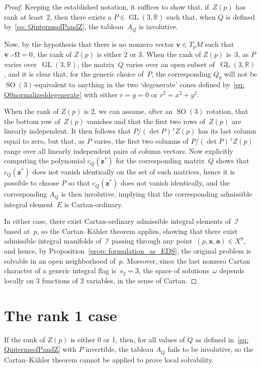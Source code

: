 \documentclass[pdftex]{sigma}
\numberwithin{equation}{section}
\newcommand{\cI}{{\mathcal I}}
\newcommand{\bbR}{{\mathbb R}}
\newcommand{\GL}{\operatorname{GL}}
\newcommand{\SO}{\operatorname{SO}}
\newcommand{\mba}{\mathbf{a}}
\newcommand{\mbv}{\mathbf{v}}
\newcommand{\mbx}{\mathbf{x}}
\newcommand{\mbz}{\mathbf{z}}
\newcommand{\lhk}{\mathbin{\hbox{\vrule height1.4pt width4pt depth-1pt
 \vrule height4pt width0.4pt depth-1pt}}}
\begin{document}
\begin{proof}Keeping the established notation, it suffices to show that, if~$Z(p)$ has rank at least~$2$, then there exists a $P\in\GL(3,\bbR)$ such that, when $Q$ is defined by~\eqref{eq: QintermsofPandZ}, the tableau~$A_Q$ is involutive.

Now, by the hypothesis that there is no nonzero vector $\mbv\in T_pM$
such that $\mbv\lhk\Omega=0$, the rank of $Z(p)$ is either $2$ or $3$.
When the rank of $Z(p)$ is~$3$,
as $P$ varies over~$\GL(3,\bbR)$,
the matrix~$Q$ varies over an open subset of~$\GL(3,\bbR)$,
and it is clear that, for the generic choice of~$P$,
the corresponding $Q_0$ will not be $\SO(3)$-equivalent to anything
in the two `degenerate' cones defined by~\eqref{eq: Q0normalizeddegenerate}
with either $r=y=0$ or $r^2=x^2+y^2$.

When the rank of $Z(p)$ is $2$, we can assume, after an $\SO(3)$ rotation,
that the bottom row of~$Z(p)$ vanishes and that the first two rows of~$Z(p)$
are linearly independent. It then follows that $P/(\det P)\, {}^t\!Z(p)$
has its last column equal to zero, but that, as $P$ varies, the first
two columns of $P/(\det P)\, {}^t\!Z(p)$ range over all linearly independent
pairs of column vectors. Now explicitly computing the polynomial $c_Q(\mbz^*)$
for the corresponding matrix~$Q$ shows that $c_Q(\mbz^*)$ does not vanish
identically on the set of such matrices, hence it is possible to choose $P$
so that $c_Q(\mbz^*)$ does not vanish identically, and the corresponding $A_Q$
is then involutive, implying that the corresponding admissible integral
element~$E$ is Cartan-ordinary.

In either case, there exist Cartan-ordinary admissible integral elements
of~$\cI$ based at~$p$, so the Cartan--K\"ahler theorem applies, showing
that there exist admissible integral manifolds of~$\cI$ passing through
any point~$(p,\mbx,\mba)\in X^9$, and hence,
by Proposition~\ref{prop: formulation_as_EDS},
the original problem is solvable in an open neighborhood of~$p$.
Moreover, since the last nonzero Cartan character
of a generic integral flag is~$s_2 = 3$,
the space of solutions~$\omega$
depends locally on $3$ functions of $2$ variables,
in the sense of Cartan.
\end{proof}

\section{The rank 1 case}\label{sec: Zrank1}
If the rank of $Z(p)$ is either 0 or 1,
then, for all values of $Q$ as defined in~\eqref{eq: QintermsofPandZ}
with $P$ invertible, the tableau $A_Q$ fails to be involutive,
so the Cartan--K\"ahler theorem cannot be applied to prove local solvability.
\end{document}
